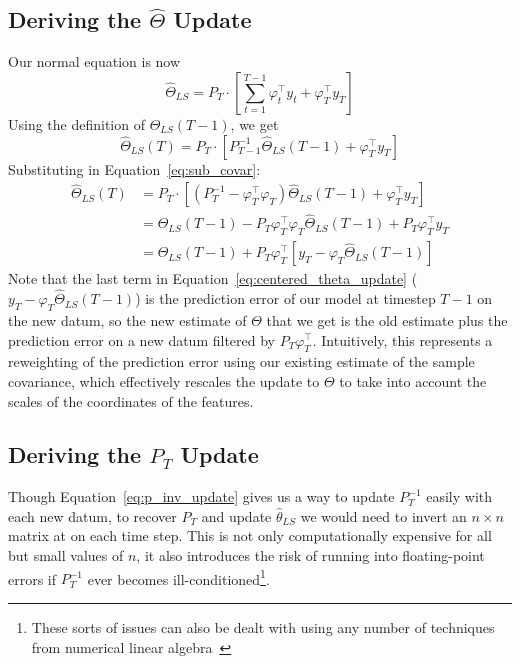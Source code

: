 \subsection{Deriving the $\hat\Theta$ Update}
Our normal equation is now
\begin{equation}
  \hat\Theta_{LS} = P_T \cdot \left[\sum_{t=1}^{T-1} \varphi_t^\top y_t + \varphi_T^\top y_T
\right]
\end{equation}
Using the definition of $\hat\Theta_{LS}(T - 1)$, we get
\begin{equation}
  \hat\Theta_{LS}(T) = P_T \cdot \left[P_{T-1}^{-1} \hat\Theta_{LS}(T-1) + \varphi_T^\top y_T\right]
\end{equation}
Substituting in Equation~\ref{eq:sub_covar}:
\begin{align}
  \hat\Theta_{LS}(T) &= P_T \cdot \left[(P_{T}^{-1} - \varphi_T^\top \varphi_T) \hat\Theta_{LS}(T-1) + \varphi_T^\top y_T\right] \\
                     &= \hat\Theta_{LS}(T - 1) - P_T \varphi_T^\top \varphi_T \hat\Theta_{LS}(T-1) + P_T \varphi_T^\top y_T \\
                     &= \hat\Theta_{LS}(T - 1) + P_T \varphi_T^\top \left[y_T - \varphi_T\hat\Theta_{LS}(T-1)\right] \label{eq:centered_theta_update}
\end{align}
Note that the last term in Equation~\ref{eq:centered_theta_update} ($y_T -
\varphi_T\hat\Theta_{LS}(T-1)$) is the prediction error of our model at
timestep $T-1$ on the new datum, so the new estimate of $\Theta$ that we get is
the old estimate plus the prediction error on a new datum filtered by $P_T
\varphi_T^\top$. Intuitively, this represents a reweighting of the prediction
error using our existing estimate of the sample covariance, which effectively
rescales the update to $\Theta$ to take into account the scales of the
coordinates of the features.

\subsection{Deriving the $P_T$ Update}
Though Equation~\ref{eq:p_inv_update} gives us a way to update $P_T^{-1}$
easily with each new datum, to recover $P_T$ and update
$\hat\theta_{LS}$ we would need to invert an $n\times n$ matrix at on each time
step. This is not only computationally expensive for all but small values of
$n$, it also introduces the risk of running into floating-point errors if
$P_T^{-1}$ ever becomes ill-conditioned\footnote{These sorts of issues can also
be dealt with using any number of techniques from numerical linear
algebra~\cite{trefethen1997numerical}}.

